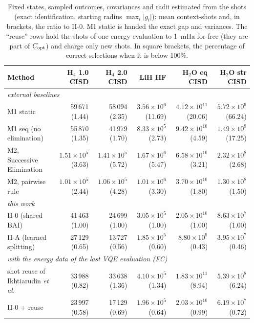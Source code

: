 \documentclass[aps,pra,reprint,superscriptaddress,nofootinbib]{revtex4-2}
\begin{document}
\begin{table}[!htb]
\centering\small
\caption{Fixed states, sampled outcomes, covariances and radii estimated from the shots (exact identification, starting radius $\max_i\lvert g_i\rvert$): mean context-shots and, in brackets, the ratio to II-0. M1 static is handed the exact gap and variances. The ``reuse'' rows hold the shots of one energy evaluation to 1~mHa for free (they are part of $C_{\rm opt}$) and charge only new shots. In square brackets, the percentage of correct selections when it is below 100\%.}
\label{tab:q8fixed}
\footnotesize\setlength{\tabcolsep}{4pt}
\begin{tabular}{lrrrrr}
\toprule
Method & H$_4$ 1.0 CISD & H$_4$ 2.0 CISD & LiH HF & H$_2$O eq CISD & H$_2$O str CISD \\
\midrule
\multicolumn{6}{l}{\emph{external baselines}} \\
M1 static & 59\,671 (1.44) & 58\,094 (2.35) & $3.56\times10^{6}$ (11.69) & $4.12\times10^{11}$ (20.06) & $5.72\times10^{9}$ (66.24) \\
M1 seq (no elimination) & 55\,870 (1.35) & 41\,979 (1.70) & $8.33\times10^{5}$ (2.73) & $9.42\times10^{10}$ (4.59) & $1.49\times10^{9}$ (17.25) \\
M2, Successive Elimination & $1.51\times10^{5}$ (3.63) & $1.41\times10^{5}$ (5.72) & $1.67\times10^{6}$ (5.47) & $6.58\times10^{10}$ (3.21) & $2.32\times10^{8}$ (2.68) \\
M2, pairwise rule & $1.01\times10^{5}$ (2.44) & $1.06\times10^{5}$ (4.28) & $1.01\times10^{6}$ (3.30) & $3.70\times10^{10}$ (1.80) & $1.30\times10^{8}$ (1.50) \\
\multicolumn{6}{l}{\emph{this work}} \\
II-0 (shared BAI) & 41\,463 (1.00) & 24\,699 (1.00) & $3.05\times10^{5}$ (1.00) & $2.05\times10^{10}$ (1.00) & $8.63\times10^{7}$ (1.00) \\
II-A (learned splitting) & 27\,129 (0.65) & 13\,727 (0.56) & $1.85\times10^{5}$ (0.60) & $8.80\times10^{9}$ (0.43) & $3.95\times10^{7}$ (0.46) \\
\multicolumn{6}{l}{\emph{with the energy data of the last VQE evaluation (FC)}} \\
shot reuse of Ikhtiarudin \textit{et al.} & 33\,988 (0.82) & 33\,638 (1.36) & $4.10\times10^{5}$ (1.34) & $1.83\times10^{11}$ (8.94) & $5.39\times10^{8}$ (6.24) \\
II-0 + reuse & 23\,997 (0.58) & 17\,129 (0.69) & $1.96\times10^{5}$ (0.64) & $2.03\times10^{10}$ (0.99) & $6.19\times10^{7}$ (0.72) \\

\end{tabular}
\end{table}
\end{document}
